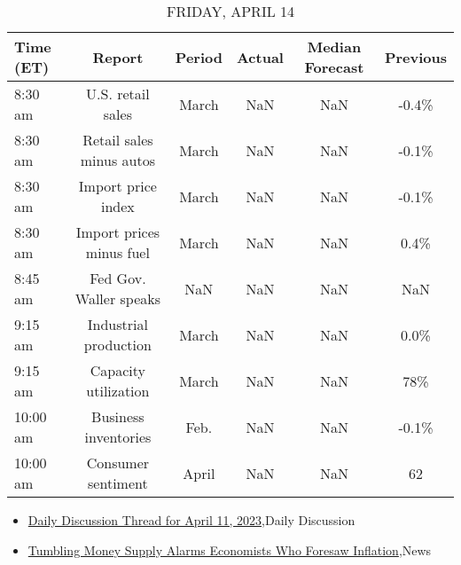 \documentclass{article}%
\begin{document}
%


\begin{table}[htbp]%
\caption{FRIDAY, APRIL 14}%
\centering%
\begin{adjustbox}{width=1\textwidth}%
\begin{tabular}{lccccc}
\toprule
Time (ET) &                   Report & Period & Actual & Median Forecast & Previous \\
\midrule
  8:30 am &        U.S. retail sales &  March &    NaN &             NaN &    -0.4\% \\
  8:30 am & Retail sales minus autos &  March &    NaN &             NaN &    -0.1\% \\
  8:30 am &       Import price index &  March &    NaN &             NaN &    -0.1\% \\
  8:30 am & Import prices minus fuel &  March &    NaN &             NaN &     0.4\% \\
  8:45 am &   Fed Gov. Waller speaks &    NaN &    NaN &             NaN &      NaN \\
  9:15 am &    Industrial production &  March &    NaN &             NaN &     0.0\% \\
  9:15 am &     Capacity utilization &  March &    NaN &             NaN &      78\% \\
 10:00 am &     Business inventories &   Feb. &    NaN &             NaN &    -0.1\% \\
 10:00 am &       Consumer sentiment &  April &    NaN &             NaN &       62 \\
\bottomrule
\end{tabular}
%
\end{adjustbox}%
\end{table}

%
\begin{itemize}%
\item%
\href{https://reddit.com/r/wallstreetbets/comments/12iex92/daily\_discussion\_thread\_for\_april\_11\_2023/}{Daily Discussion Thread for April 11, 2023},Daily Discussion%
\item%
\href{https://reddit.com/r/Economics/comments/12ief9c/tumbling\_money\_supply\_alarms\_economists\_who/}{Tumbling Money Supply Alarms Economists Who Foresaw Inflation},News%
\end{itemize}%
\end{document}
